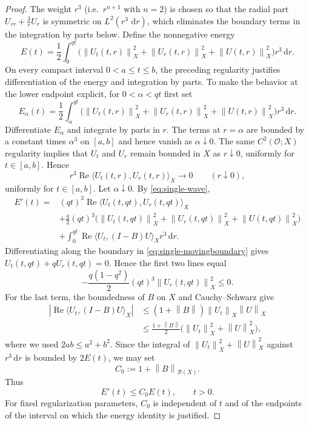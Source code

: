 \documentclass[12pt,a4paper]{article}
\theoremstyle{remark}
\newcommand{\dd}{\,\mathrm d}
\newcommand{\norm}[1]{\left\lVert#1\right\rVert}
\begin{document}
\begin{proof}
\medskip
The weight $r^3$ (i.e.\ $r^{n+1}$ with $n=2$) is chosen so that the radial part $U_{rr}+\tfrac3rU_r$ is  symmetric on $L^2(r^3\,\dd r)$,
which eliminates the boundary terms in the integration by parts below.
Define the nonnegative energy
\begin{equation}\label{eq:single-energy}
E(t)=\frac12\int_0^{qt}
\bigl(\norm{U_t(t,r)}_X^2+\norm{U_r(t,r)}_X^2+\norm{U(t,r)}_X^2\bigr)r^3\dd r.
\end{equation}
On every compact interval $0<a\le t\le b$, the preceding regularity justifies differentiation of the energy and integration by parts.
To make the behavior at the lower endpoint explicit, for $0<\alpha<qt$ first
set
\[
E_\alpha(t)=\frac12\int_\alpha^{qt}
\bigl(\norm{U_t(t,r)}_X^2+\norm{U_r(t,r)}_X^2+\norm{U(t,r)}_X^2\bigr)r^3\dd r.
\]
Differentiate $E_\alpha$ and integrate by parts in $r$. The terms at
$r=\alpha$ are bounded by a constant times $\alpha^3$ on $[a,b]$ and hence
vanish as $\alpha\downarrow0$.
The same $C^2(\mathcal O;X)$ regularity implies that $U_t$ and
$U_r$ remain bounded in $X$ as $r\downarrow0$, uniformly for
$t\in[a,b]$. Hence
\[
r^3\operatorname{Re}\langle U_t(t,r),U_r(t,r)\rangle_X
\longrightarrow0
\qquad(r\downarrow0),
\]
uniformly for $t\in[a,b]$. Let $\alpha\downarrow0$.
By \eqref{eq:single-wave},
\begin{align*}
E'(t)={}&(qt)^3\operatorname{Re}\langle U_t(t,qt),U_r(t,qt)\rangle_X\\
&+\frac q2(qt)^3\bigl(\norm{U_t(t,qt)}_X^2+
\norm{U_r(t,qt)}_X^2+\norm{U(t,qt)}_X^2\bigr)\\
&+\int_0^{qt}\operatorname{Re}\langle U_t,(I-B)U\rangle_Xr^3\dd r.
\end{align*}
Differentiating along the boundary in \eqref{eq:single-movingboundary} gives
$U_t(t,qt)+qU_r(t,qt)=0$.
Hence the first two lines equal
\[
-\frac{q(1-q^2)}2(qt)^3\norm{U_r(t,qt)}_X^2\le0.
\]
For the last term, the boundedness of $B$ on $X$ and Cauchy--Schwarz give
\begin{align*}
\left|\operatorname{Re}\langle U_t,(I-B)U\rangle_X\right|
&\le (1+\norm B)\norm{U_t}_X\norm U_X\\
&\le \frac{1+\norm B}{2}
   \bigl(\norm{U_t}_X^2+\norm U_X^2\bigr),
\end{align*}
where we used $2ab\leq a^2+b^2$. Since the integral of
$\norm{U_t}_X^2+\norm U_X^2$ against $r^3\dd r$ is bounded by
$2E(t)$, we may set
\[
C_0:=1+\norm{B}_{\mathcal B(X)}.
\]
Thus
\begin{equation}\label{eq:single-gronwall}
E'(t)\leq C_0 E(t),\qquad t>0.
\end{equation}
For fixed regularization parameters, $C_0$ is independent of $t$ and of the
endpoints of the interval on which the energy identity is justified.
\medskip


\end{proof}
\end{document}
